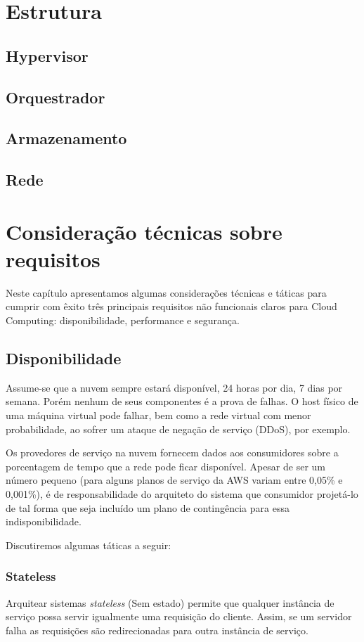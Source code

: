 \chapter{Estrutura}

\section{Hypervisor}
\section{Orquestrador}
\section{Armazenamento}
\section{Rede}

\chapter{Consideração técnicas sobre requisitos}
	Neste capítulo apresentamos algumas considerações técnicas e táticas para cumprir com êxito três principais requisitos não funcionais claros para Cloud Computing: disponibilidade, performance e segurança.

\section{Disponibilidade}

	Assume-se que a nuvem sempre estará disponível, 24 horas por dia, 7 dias por semana. Porém nenhum de seus componentes é a prova de falhas. O host físico de uma máquina virtual pode falhar, bem como a rede virtual com menor probabilidade, ao sofrer um ataque de negação de serviço (DDoS), por exemplo.

	Os provedores de serviço na nuvem fornecem dados aos consumidores sobre a porcentagem de tempo que a rede pode ficar disponível. Apesar de ser um número pequeno (para alguns planos de serviço da AWS variam entre 0,05\% e 0,001\%), é de responsabilidade do arquiteto do sistema que consumidor projetá-lo de tal forma que seja incluído um plano de contingência para essa indisponibilidade.

	Discutiremos algumas táticas a seguir:

	\subsection{Stateless}
	Arquitear sistemas \textit{stateless} (Sem estado) permite que qualquer instância de serviço possa servir igualmente uma requisição do cliente. Assim, se um servidor falha as requisições são redirecionadas para outra instância de serviço.

